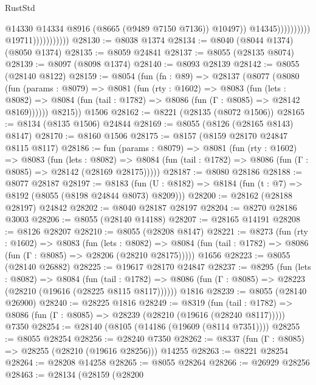 \begin{lexlean}{RustStd}
\begin{coremodule}
                                                  @14330
                                                  @14334
                                                  @8916
                                                  (@8665 (@9489 @7150 @7136))
                                                  @10497))
                                              @14345))))))))))
                          @19711)))))))))))
@28130 := @8038 @1374
@28134 := @8040 (@8044 @1374) (@8050 @1374)
@28135 := @8059 @24841
@28137 := @8055 (@28135 @8074)
@28139 := @8097 (@8098 @1374)
@28140 := @8093 @28139
@28142 := @8055 (@28140 @8122)
@28159 := @8054
    (fun (fn : @89) =>
    @28137
      (@8077
        (@8080
          (fun (params : @8079) =>
          @8081
            (fun (rty : @1602) =>
            @8083
              (fun (lets : @8082) =>
              @8084 (fun (tail : @1782) => @8086 (fun (Γ : @8085) => @28142 @8169))))))
        @8215))
    @1506
@28162 := @8221 (@28135 (@8072 @1506))
@28165 := @8134 (@8135 @1506) @24844
@28169 := @8055 (@8126 (@28165 @8143) @8147)
@28170 := @8160 @1506
@28175 := @8157 (@8159 @28170 @24847 @8115 @8117)
@28186 := fun (params : @8079) =>
  @8081
    (fun (rty : @1602) =>
    @8083
      (fun (lets : @8082) =>
      @8084 (fun (tail : @1782) => @8086 (fun (Γ : @8085) => @28142 (@28169 @28175)))))
@28187 := @8080 @28186
@28188 := @8077 @28187
@28197 := @8183
    (fun (U : @8182) => @8184 (fun (t : @7) => @8192 (@8055 (@8198 @24844 @8073) @8209)))
@28200 := @28162 (@28188 @28197) @24842
@28202 := @8040 @28187 @28197
@28204 := @8270 @28186 @3003
@28206 := @8055 (@28140 @14188)
@28207 := @28165 @14191
@28208 := @8126 @28207
@28210 := @8055 (@28208 @8147)
@28221 := @8273
    (fun (rty : @1602) =>
    @8083
      (fun (lets : @8082) =>
      @8084 (fun (tail : @1782) => @8086 (fun (Γ : @8085) => @28206 (@28210 @28175)))))
    @1656
@28223 := @8055 (@28140 @26882)
@28225 := @19617 @28170 @24847
@28237 := @8295
    (fun (lets : @8082) =>
    @8084
      (fun (tail : @1782) =>
      @8086 (fun (Γ : @8085) => @28223 (@28210 (@19616 (@28225 @8115 @8117))))))
    @1816
@28239 := @8055 (@28140 @26900)
@28240 := @28225 @1816
@28249 := @8319
    (fun (tail : @1782) => @8086 (fun (Γ : @8085) => @28239 (@28210 (@19616 (@28240 @8117)))))
    @7350
@28254 := @28140 (@8105 (@14186 (@19609 (@8114 @7351))))
@28255 := @8055 @28254
@28256 := @28240 @7350
@28262 := @8337 (fun (Γ : @8085) => @28255 (@28210 (@19616 @28256))) @14255
@28263 := @8221 @28254
@28264 := @28208 @14258
@28265 := @8055 @28264
@28266 := @26929 @28256
@28463 := @28134
    (@28159
      (@28200

\end{coremodule}
\end{lexlean}
